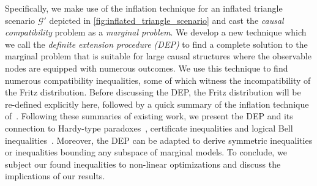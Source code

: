 \documentclass[aps, 10pt, english, twoside, pra, nofootinbib, longbibliography]{revtex4-1}
\theoremstyle{plain}
\theoremstyle{definition}
\theoremstyle{remark}
\newcommand{\graph}{\mathcal{G}}
\newcommand{\ts}{{\graph}}
\begin{document}
    Specifically, we make use of the inflation technique for an inflated triangle scenario $\ts'$ depicted in \cref{fig:inflated_triangle_scenario} and cast the \textit{causal compatibility} problem as a \textit{marginal problem}. We develop a new technique which we call the \textit{definite extension procedure (DEP)} to find a complete solution to the marginal problem that is suitable for large causal structures where the observable nodes are equipped with numerous outcomes. We use this technique to find numerous compatibility inequalities, some of which witness the incompatibility of the Fritz distribution. Before discussing the DEP, the Fritz distribution will be re-defined explicitly here, followed by a quick summary of the inflation technique of~\cite{Inflation}. Following these summaries of existing work, we present the DEP and its connection to Hardy-type paradoxes~\cite{Inflation,Liang_2011,Mansfield_2012}, certificate inequalities and logical Bell inequalities~\cite{Abramsky_2011}. Moreover, the DEP can be adapted to derive symmetric inequalities or inequalities bounding any subspace of marginal models. To conclude, we subject our found inequalities to non-linear optimizations and discuss the implications of our results.
\end{document}
